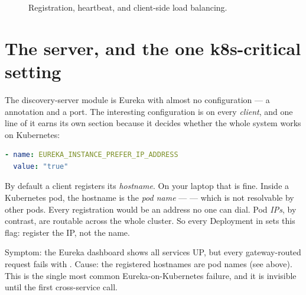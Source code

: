 \begin{figure}[h]
\centering
{}
\caption{Registration, heartbeat, and client-side load balancing.}
\end{figure}

\section{The server, and the one k8s-critical setting}

The discovery-server module is Eureka with almost no configuration ---
a  annotation and a port. The interesting
configuration is on every \emph{client}, and one line of it earns its own
section because it decides whether the whole system works on Kubernetes:

\begin{lstlisting}[language=yaml]
- name: EUREKA_INSTANCE_PREFER_IP_ADDRESS
  value: "true"
\end{lstlisting}

By default a client registers its \emph{hostname}. On your laptop that is
fine. Inside a Kubernetes pod, the hostname is the \emph{pod name} ---
 --- which is not resolvable by other
pods. Every registration would be an address no one can dial.
Pod \emph{IPs}, by contrast, are routable across the whole cluster.
So every Deployment in  sets this flag: register
the IP, not the name.

\begin{pitfall}
Symptom: the Eureka dashboard shows all services UP, but every
gateway-routed request fails with . Cause: the
registered hostnames are pod names (see above). This is the single most
common Eureka-on-Kubernetes failure, and it is invisible until the first
cross-service call.
\end{pitfall}

